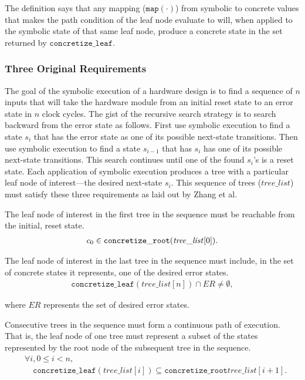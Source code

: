 The definition says that any mapping ($\mathtt{map(\cdot)}$) from symbolic to concrete values that makes
the path condition of the leaf node evaluate to \texttrue{} will, when applied to
the symbolic state of that same leaf node, produce a concrete state in the set returned
by $\mathtt{concretize\_leaf}$.

\subsubsection{Three Original Requirements} The goal of the symbolic execution
of a hardware design is to find a sequence of $n$ inputs that will take the hardware
module from an initial reset state to an error state in $n$ clock cycles. The
gist of the recursive search strategy is to search backward from the error
state as follows. First use symbolic execution to find a state $s_i$ that has the error
state as one of its possible next-state transitions. Then use symbolic execution
to find a state $s_{i-1}$ that has $s_i$ has one of its possible next-state
transitions. This search continues until one of the found $s_i$'s is a reset
state. Each application of symbolic execution produces a tree with a particular
leaf node of interest---the desired next-state $s_i$. This sequence of trees ($\mathit{tree\_list}$)
must satisfy these three requirements as laid out by Zhang et al.
\setcounter{property}{0}
\renewcommand{\theproperty}{Z.\arabic{property}}
\begin{property}
  \label{prop:startinit} The leaf node of interest in the first tree in the
  sequence must be reachable from the initial, reset state.
  \begin{align*}
    c_0 \in \mathtt{concretize\_root}(\mathit{tree\_list}[0]).
  \end{align*}
\end{property}

\begin{property}
  \label{prop:enderror} The leaf node of interest in the last tree in the
  sequence must include, in the set of concrete states it represents, one of the
  desired error states. 
  \begin{align*}
    \mathtt{concretize\_leaf}(\mathit{tree\_list}[n]) \cap \mathit{ER} \neq
    \emptyset,
  \end{align*}
\end{property}
where $\mathit{ER}$ represents the set of desired error states.

\begin{property}
  \label{prop:stitch}
  Consecutive trees in the sequence must form a continuous path of
  execution. That is, the leaf node of one tree must represent a subset of the
  states represented by the root node of the subsequent tree in the sequence.
  \begin{align*}
    &\forall i, 0 \le i < n,\\
    &\quad\mathtt{concretize\_leaf}(\mathit{tree\_list}[i]) \subseteq
\mathtt{concretize\_root}\mathit{tree\_list}[i+1].
\end{align*}

\end{property}

